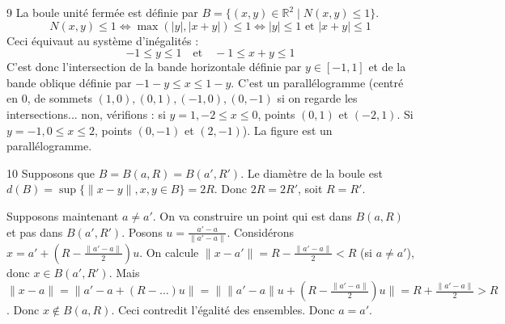 \begin{correction}{9}
La boule unité fermée est définie par $B = \{ (x,y) \in \mathbb{R}^2 \mid N(x,y) \le 1 \}$.
$$ N(x,y) \le 1 \iff \max(|y|, |x+y|) \le 1 \iff |y| \le 1 \text{ et } |x+y| \le 1 $$
Ceci équivaut au système d'inégalités :
$$ -1 \le y \le 1 \quad \text{et} \quad -1 \le x+y \le 1 $$
C'est donc l'intersection de la bande horizontale définie par $y \in [-1,1]$ et de la bande oblique définie par $-1-y \le x \le 1-y$.
C'est un parallélogramme (centré en 0, de sommets $(1,0), (0,1), (-1,0), (0,-1)$ si on regarde les intersections... non, vérifions : si $y=1, -2 \le x \le 0$, points $(0,1)$ et $(-2,1)$. Si $y=-1, 0 \le x \le 2$, points $(0,-1)$ et $(2,-1)$).
La figure est un parallélogramme.
\end{correction}

\begin{correction}{10}
Supposons que $B = B(a,R) = B(a',R')$.
Le diamètre de la boule est $d(B) = \sup \{ \|x-y\|, x,y \in B \} = 2R$.
Donc $2R = 2R'$, soit $R=R'$.

Supposons maintenant $a \ne a'$.
On va construire un point qui est dans $B(a,R)$ et pas dans $B(a',R')$.
Posons $u = \frac{a'-a}{\|a'-a\|}$. Considérons $x = a' + \left(R - \frac{\|a'-a\|}{2}\right)u$.
On calcule $\|x-a'\| = R - \frac{\|a'-a\|}{2} < R$ (si $a \ne a'$), donc $x \in B(a',R')$.
Mais $\|x-a\| = \|a' - a + (R - \dots)u\| = \| \|a'-a\|u + (R - \frac{\|a'-a\|}{2})u \| = R + \frac{\|a'-a\|}{2} > R$.
Donc $x \notin B(a,R)$.
Ceci contredit l'égalité des ensembles. Donc $a=a'$.
\end{correction}

